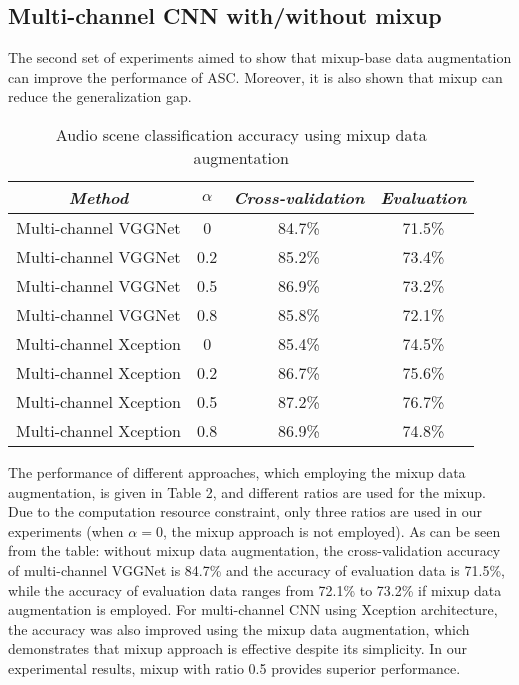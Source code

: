 \documentclass[conference]{IEEEtran}
\begin{document}
\subsection{Multi-channel CNN with/without mixup}

The second set of experiments aimed to show that mixup-base data augmentation can improve the performance of ASC. Moreover, it is also shown that mixup can reduce the generalization gap.

\begin{table}[htbp]
	\caption{Audio scene classification accuracy using mixup data augmentation}
	\begin{center}
		\begin{tabular}{|c|c|c|c|}
			\cline{1-4}
			\textbf{\textit{Method}} & \textit{$\alpha$}&  \textbf{\textit{Cross-validation}}& \textbf{\textit{Evaluation}} \\
			\hline
			Multi-channel VGGNet & 0   & 84.7\%  & 71.5\%  \\
			Multi-channel VGGNet & 0.2 & 85.2\%  & 73.4\%  \\
			Multi-channel VGGNet & 0.5 & 86.9\%  & 73.2\%  \\
			Multi-channel VGGNet & 0.8 & 85.8\%  & 72.1\%  \\
			Multi-channel Xception & 0 & 85.4\%  & 74.5\%  \\
			Multi-channel Xception & 0.2 & 86.7\%  & 75.6\%  \\
			Multi-channel Xception & 0.5 & 87.2\%  & 76.7\%  \\
			Multi-channel Xception & 0.8 & 86.9\%  & 74.8\%  \\
			\hline
		\end{tabular}
		\label{tab2}
	\end{center}
\end{table}

The performance of different approaches, which employing the mixup data augmentation, is given in Table 2, and different ratios are used for the mixup. Due to the computation resource constraint, only three ratios are used in our experiments (when $\alpha = 0$, the mixup approach is not employed). As can be seen from the table: without mixup data augmentation, the cross-validation accuracy of multi-channel VGGNet is 84.7\% and the accuracy of evaluation data is 71.5\%, while the accuracy of evaluation data ranges from 72.1\% to 73.2\% if mixup data augmentation is employed. For multi-channel CNN using Xception architecture, the accuracy was also improved using the mixup data augmentation, which demonstrates that mixup approach is effective despite its simplicity. In our experimental results, mixup with ratio 0.5 provides superior performance.
\end{document}
